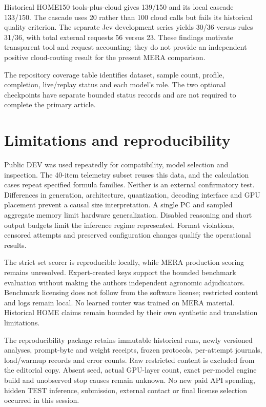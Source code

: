 \documentclass[10pt,a4paper]{article}
\begin{document}
Historical HOME150 tools-plus-cloud gives 139/150 and its local cascade 133/150. The cascade uses 20 rather than 100 cloud calls but fails its historical quality criterion. The separate Jev development series yields 30/36 versus rules 31/36, with total external requests 56 versus 23. These findings motivate transparent tool and request accounting; they do not provide an independent positive cloud-routing result for the present MERA comparison.


The repository coverage table identifies dataset, sample count, profile, completion, live/replay status and each model's role. The two optional checkpoints have separate bounded status records and are not required to complete the primary article.


\section{Limitations and reproducibility}

Public DEV was used repeatedly for compatibility, model selection and inspection. The 40-item telemetry subset reuses this data, and the calculation cases repeat specified formula families. Neither is an external confirmatory test. Differences in generation, architecture, quantization, decoding interface and GPU placement prevent a causal size interpretation. A single PC and sampled aggregate memory limit hardware generalization. Disabled reasoning and short output budgets limit the inference regime represented. Format violations, censored attempts and preserved configuration changes qualify the operational results.


The strict set scorer is reproducible locally, while MERA production scoring remains unresolved. Expert-created keys support the bounded benchmark evaluation without making the authors independent agronomic adjudicators. Benchmark licensing does not follow from the software license; restricted content and logs remain local. No learned router was trained on MERA material. Historical HOME claims remain bounded by their own synthetic and translation limitations.


The reproducibility package retains immutable historical runs, newly versioned analyses, prompt-byte and weight receipts, frozen protocols, per-attempt journals, load/warmup records and error counts. Raw restricted content is excluded from the editorial copy. Absent seed, actual GPU-layer count, exact per-model engine build and unobserved stop causes remain unknown. No new paid API spending, hidden TEST inference, submission, external contact or final license selection occurred in this session.
\end{document}
